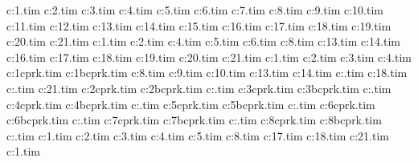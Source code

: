c:\wipeout\textures\brdtrk1.tim
c:\wipeout\textures\brdtrk2.tim
c:\wipeout\textures\brdtrk3.tim
c:\wipeout\textures\brdtrk4.tim
c:\wipeout\textures\brdtrk5.tim
c:\wipeout\textures\brdtrk6.tim
c:\wipeout\textures\brdtrk7.tim
c:\wipeout\textures\brdtrk8.tim
c:\wipeout\textures\brdtrk9.tim
c:\wipeout\textures\brdtrk10.tim
c:\wipeout\textures\brdtrk11.tim
c:\wipeout\textures\brdtrk12.tim
c:\wipeout\textures\brdtrk13.tim
c:\wipeout\textures\brdtrk14.tim
c:\wipeout\textures\brdtrk15.tim
c:\wipeout\textures\brdtrk16.tim
c:\wipeout\textures\brdtrk17.tim
c:\wipeout\textures\brdtrk18.tim
c:\wipeout\textures\brdtrk19.tim
c:\wipeout\textures\brdtrk20.tim
c:\wipeout\textures\brdtrk21.tim
c:\wipeout\textures\brgwal1.tim
c:\wipeout\textures\brgwal2.tim
c:\wipeout\textures\brgwal4.tim
c:\wipeout\textures\brgwal5.tim
c:\wipeout\textures\brgwal6.tim
c:\wipeout\textures\brgwal8.tim
c:\wipeout\textures\brgwal13.tim
c:\wipeout\textures\brgwal14.tim
c:\wipeout\textures\brgwal16.tim
c:\wipeout\textures\brgwal17.tim
c:\wipeout\textures\brgwal18.tim
c:\wipeout\textures\brgwal19.tim
c:\wipeout\textures\brgwal20.tim
c:\wipeout\textures\brgwal21.tim
c:\wipeout\textures\carprk1.tim
c:\wipeout\textures\carprk2.tim
c:\wipeout\textures\pointr3.tim
c:\wipeout\textures\brntrk4.tim
c:\wipeout\textures\no1cprk.tim
c:\wipeout\textures\no1bcprk.tim
c:\wipeout\textures\brntrk8.tim
c:\wipeout\textures\carprk9.tim
c:\wipeout\textures\carprk10.tim
c:\wipeout\textures\carprk13.tim
c:\wipeout\textures\carprk14.tim
c:\wipeout\textures\cpmone.tim
c:\wipeout\textures\pointr18.tim
c:\wipeout\textures\cpmbotom.tim
c:\wipeout\textures\crpark21.tim
c:\wipeout\textures\no2cprk.tim
c:\wipeout\textures\no2bcprk.tim
c:\wipeout\textures\cpmtwo.tim
c:\wipeout\textures\no3cprk.tim
c:\wipeout\textures\no3bcprk.tim
c:\wipeout\textures\cpmthree.tim
c:\wipeout\textures\no4cprk.tim
c:\wipeout\textures\no4bcprk.tim
c:\wipeout\textures\cpmfour.tim
c:\wipeout\textures\no5cprk.tim
c:\wipeout\textures\no5bcprk.tim
c:\wipeout\textures\cpmfive.tim
c:\wipeout\textures\no6cprk.tim
c:\wipeout\textures\no6bcprk.tim
c:\wipeout\textures\cpmsix.tim
c:\wipeout\textures\no7cprk.tim
c:\wipeout\textures\no7bcprk.tim
c:\wipeout\textures\cpmseven.tim
c:\wipeout\textures\no8cprk.tim
c:\wipeout\textures\no8bcprk.tim
c:\wipeout\textures\cpmeight.tim
c:\wipeout\textures\brnwal1.tim
c:\wipeout\textures\chev2.tim
c:\wipeout\textures\chev3.tim
c:\wipeout\textures\brnwal4.tim
c:\wipeout\textures\brnwal5.tim
c:\wipeout\textures\brnwal8.tim
c:\wipeout\textures\chev17.tim
c:\wipeout\textures\chev18.tim
c:\wipeout\textures\chev21.tim
c:\wipeout\textures\drktun1.tim
